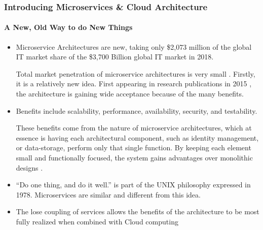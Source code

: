 \begin{frame}
  \frametitle{Introducing Microservices \& Cloud Architecture}
  \framesubtitle{A New, Old Way to do New Things}
  \begin{itemize}
    \item<1->  Microservice Architectures are new, taking only \$2,073 million of the global IT market share of the \$3,700 Billion global IT market in 2018.

           {\scriptsize{Total market penetration of microservice architectures is very small \parencite{rakeMicroservicesArchitectureMarket2020,gartnerGlobalInformationTechnology2021}. Firstly, it is a relatively new idea. First appearing in research publications in 2015 \parencite{lucaflorioDecentralizedSelfadaptationLargescale2015}, the architecture is gaining wide acceptance because of the many benefits. }}

    \item<2-> Benefits include scalability, performance, availability, security, and testability.

           {\scriptsize{These benefits come from the nature of microservice architectures, which at essence is having each architectural component, such as identity management, or data-storage, perform only that single function. By keeping each element small and functionally focused, the system gains advantages over monolithic designs \parencite{liUnderstandingAddressingQuality2021}. }}

    \item<3-> ``Do one thing, and do it well.'' is part of the UNIX philosophy expressed in 1978. Microservices are similar and different from this idea.


    \item<4-> The lose coupling of services allows the benefits of the architecture to be most fully realized when combined with Cloud computing



  \end{itemize}
\end{frame}
